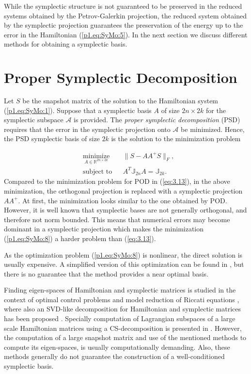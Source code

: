 While the symplectic structure is not guaranteed to be preserved in the reduced systems obtained by the Petrov-Galerkin projection, the reduced system obtained by the symplectic projection guarantees the preservation of the energy up to the error in the Hamiltonian (\ref{p1.eq:SyMo:5}). In the next section we discuss  different methods for obtaining a symplectic basis.

\section{Proper Symplectic Decomposition} \label{p1.chap:SyMo.PrSy:1}

Let $S$ be the snapshot matrix of the solution to the Hamiltonian system (\ref{p1.eq:SyMo:1}). Suppose that a symplectic basis $A$ of size $2n\times2k$ for the symplectic subspace $\mathcal A$ is provided. The \emph{proper symplectic decomposition} (PSD) requires that the error in the symplectic projection onto $\mathcal A$ be minimized. Hence, the PSD symplectic basis of size $2k$ is the solution to the minimization problem

\begin{equation} \label{p1.eq:SyMo:8}
\begin{aligned}
& \underset{A\in \mathbb R^{2n\times 2k}}{\text{minimize}}
& & \| S - AA^+S\|_F, \\
& \text{subject to}
& & A^T \mathbb{J}_{2n}A = \mathbb{J}_{2k}.
\end{aligned}
\end{equation}
Compared to the minimization problem for POD in (\ref{eq:3.13}), in the above minimization, the orthogonal projection is replaced with a symplectic projection $AA^+$. At first, the minimization looks similar to the one obtained by POD. However, it is well known that symplectic bases are not generally orthogonal, and therefore not norm bounded. This means that numerical errors may become dominant in a symplectic projection \cite{doi:10.1137/050628519} which makes the minimization (\ref{p1.eq:SyMo:8}) a harder problem than (\ref{eq:3.13}).
	
As the optimization problem (\ref{p1.eq:SyMo:8}) is nonlinear, the direct solution is usually expensive. A simplified version of this optimization can be found in \cite{doi:10.1137/140978922}, but there is no guarantee that the method provides a near optimal basis.

Finding eigen-spaces of Hamiltonian and symplectic matrices is studied in the context of optimal control problems \cite{Benner:2000ww,benner1997new,watkins2004hamiltonian,bunse1986matrix} and model reduction of Riccati equations \cite{benner1997new}, where also an SVD-like decomposition for Hamiltonian and symplectic matrices has been proposed \cite{xu2003svd}. Specially computation of Lagrangian subspaces of a large scale Hamiltonian matrices using a CS-decomposition is presented in \cite{mehrmann2016inverse,doi:10.1137/110850773}. However, the computation of a large snapshot matrix and use of the mentioned methods to compute its eigen-spaces, is usually computationally demanding. Also, these methods generally do not guarantee the construction of a well-conditioned symplectic basis.

